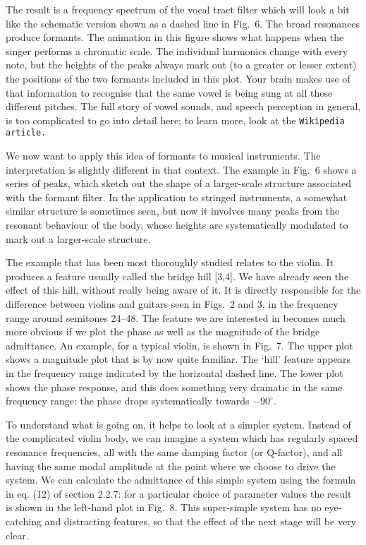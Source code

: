   The result is a frequency spectrum of the vocal tract filter which will look 
  a bit like the schematic version shown as a dashed line in Fig.\ 6. The broad 
  resonances produce formants. The animation in this figure shows what happens 
  when the singer performs a chromatic scale. The individual harmonics change 
  with every note, but the heights of the peaks always mark out (to a greater 
  or lesser extent) the positions of the two formants included in this plot. 
  Your brain makes use of that information to recognise that the same vowel is 
  being sung at all these different pitches. The full story of vowel sounds, 
  and speech perception in general, is too complicated to go into detail here; 
  to learn more, look at the \tt{}Wikipedia article\rm{}. 

  We now want to apply this idea of formants to musical instruments. The 
  interpretation is slightly different in that context. The example in Fig.\ 6 
  shows a series of peaks, which sketch out the shape of a larger-scale 
  structure associated with the formant filter. In the application to stringed 
  instruments, a somewhat similar structure is sometimes seen, but now it 
  involves many peaks from the resonant behaviour of the body, whose heights 
  are systematically modulated to mark out a larger-scale structure. 

  The example that has been most thoroughly studied relates to the violin. It 
  produces a feature usually called the bridge hill [3,4]. We have already seen 
  the effect of this hill, without really being aware of it. It is directly 
  responsible for the difference between violins and guitars seen in Figs.\ 2 
  and 3, in the frequency range around semitones 24--48. The feature we are 
  interested in becomes much more obvious if we plot the phase as well as the 
  magnitude of the bridge admittance. An example, for a typical violin, is 
  shown in Fig.\ 7. The upper plot shows a magnitude plot that is by now quite 
  familiar. The `hill' feature appears in the frequency range indicated by the 
  horizontal dashed line. The lower plot shows the phase response, and this 
  does something very dramatic in the same frequency range: the phase drops 
  systematically towards $-90^\circ$. 

  To understand what is going on, it helps to look at a simpler system. Instead 
  of the complicated violin body, we can imagine a system which has regularly 
  spaced resonance frequencies, all with the same damping factor (or Q-factor), 
  and all having the same modal amplitude at the point where we choose to drive 
  the system. We can calculate the admittance of this simple system using the 
  formula in eq. (12) of section 2.2.7: for a particular choice of parameter 
  values the result is shown in the left-hand plot in Fig.\ 8. This 
  super-simple system has no eye-catching and distracting features, so that the 
  effect of the next stage will be very clear. 

